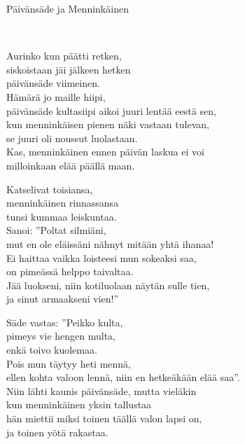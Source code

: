 \begin{song}{Päivänsäde ja Menninkäinen}
	
	
	\\

    \showversenumber	
	Aurinko kun päätti retken,\\
	siskoistaan jäi jälkeen hetken\\
	päivänsäde viimeinen.\\
	Hämärä jo maille hiipi,\\
	päivänsäde kultasiipi aikoi juuri lentää eestä sen,\\
	kun menninkäisen pienen näki vastaan tulevan,\\
	se juuri oli noussut luolastaan.\\
	Kas, menninkäinen ennen päivän laskua ei voi\\
	milloinkaan elää päällä maan.
	
    \showversenumber
	Katselivat toisiansa,\\
	menninkäinen rinnassansa\\
	tunsi kummaa leiskuntaa.\\
	Sanoi: ''Poltat silmiäni,\\
	mut en ole eläissäni nähnyt mitään yhtä ihanaa!\\
	Ei haittaa vaikka loisteesi mun sokeaksi saa,\\
	on pimeässä helppo taivaltaa.\\
	Jää luokseni, niin kotiluolaan näytän sulle tien,\\
	ja sinut armaakseni vien!''
	
    \showversenumber
	Säde vastas: ''Peikko kulta,\\
	pimeys vie hengen multa,\\
	enkä toivo kuolemaa.\\
	Pois mun täytyy heti mennä,\\
	ellen kohta valoon lennä, niin en hetkeäkään elää saa''.\\
	Niin lähti kaunis päivänsäde, mutta vieläkin\\
	kun menninkäinen yksin tallustaa\\
	hän miettii miksi toinen täällä valon lapsi on,\\
	ja toinen yötä rakastaa.
	
\end{song}
